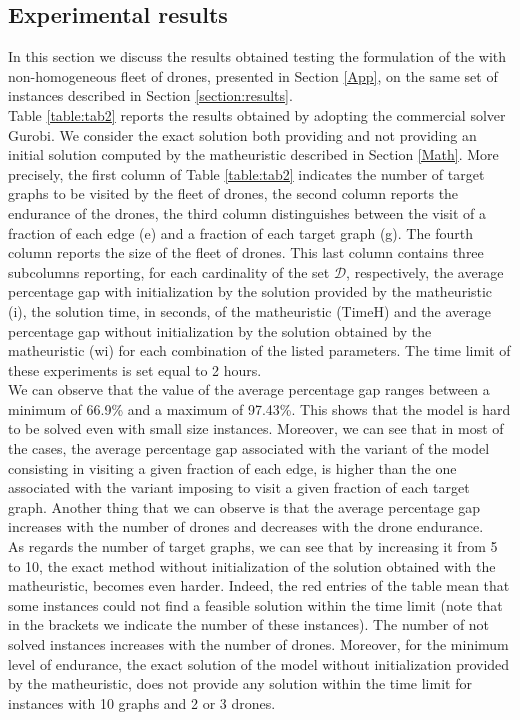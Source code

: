 \subsection*{Experimental results}
\noindent
In this section we discuss the results obtained testing the formulation of the \AMD\xspace with non-homogeneous fleet of drones, presented in Section \ref{App}, on the same set of instances described in Section \ref{section:results}.\\
\noindent
Table \ref{table:tab2} reports the results obtained by adopting the commercial solver Gurobi. We consider the exact solution both providing and not providing an initial solution computed by the matheuristic described in Section \ref{Math}. More precisely, the first column of Table \ref{table:tab2} indicates the number of target graphs to be visited by the fleet of drones, the second column reports the endurance of the drones, the third column distinguishes between the visit of a fraction of each edge (e) and a fraction of each target graph (g). The fourth column reports the size of the fleet of drones. This last column contains three subcolumns reporting, for each cardinality of the set $\mathcal D$, respectively, the average percentage gap with initialization by the solution provided by the matheuristic (i), the solution time, in seconds, of the matheuristic (TimeH) and the average percentage gap without initialization by the solution obtained by the matheuristic (wi) for each combination of the listed parameters. The time limit of these experiments is set equal to 2 hours.\\
We can observe that the value of the average percentage gap ranges between a minimum of 66.9\% and a maximum of 97.43\%. This shows that the model is hard to be solved even with small size instances. Moreover, we can see that in most of the cases, the average percentage gap associated with the variant of the model consisting in visiting a given fraction of each edge, is higher than the one associated with the variant imposing to visit a given fraction of each target graph. Another thing that we can observe is that the average percentage gap increases with the number of drones and decreases with the drone endurance.\\
\noindent
As regards the number of target graphs, we can see that by increasing it from 5 to 10, the exact method without initialization of the solution obtained with the matheuristic, becomes even harder. Indeed, the red entries of the table mean that some instances could not find a feasible solution within the time limit (note that in the brackets we indicate the number of these instances). The number of not solved instances increases with the number of drones. Moreover, for the minimum level of endurance, the exact solution of the model without initialization provided by the matheuristic, does not provide any solution within the time limit for instances with 10 graphs and 2 or 3 drones.\\
